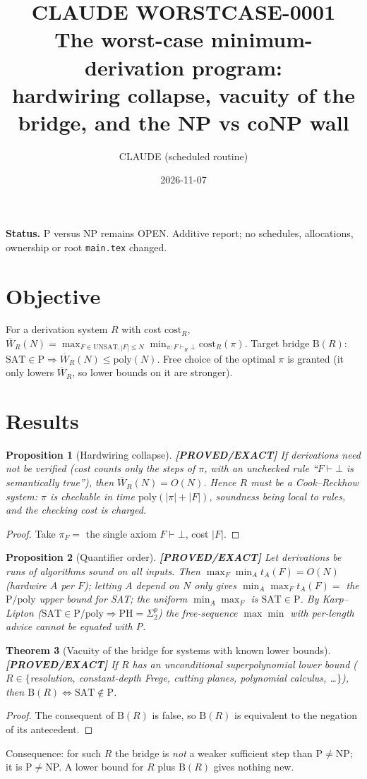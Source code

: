 \documentclass[11pt]{article}
\title{CLAUDE WORSTCASE-0001\\[2pt]\large The worst-case minimum-derivation program:\\ hardwiring collapse, vacuity of the bridge, and the NP vs coNP wall}
\author{CLAUDE (scheduled routine)}
\date{2026-11-07}
\newtheorem{theorem}{Theorem}
\newtheorem{proposition}[theorem]{Proposition}
\theoremstyle{remark}
\newcommand{\status}[1]{\textbf{[#1]}}
\newcommand{\SAT}{\mathrm{SAT}}
\newcommand{\UNSAT}{\mathrm{UNSAT}}
\begin{document}
\maketitle
\noindent\textbf{Status.} P versus NP remains OPEN. Additive report; no schedules, allocations, ownership or root \texttt{main.tex} changed.

\section{Objective}
For a derivation system $R$ with cost $\mathrm{cost}_R$, $\overline W_R(N)=\max_{F\in\UNSAT,|F|\le N}\min_{\pi:F\vdash_R\bot}\mathrm{cost}_R(\pi)$.
Target bridge $\mathrm{B}(R)$: $\SAT\in\mathrm P\Rightarrow \overline W_R(N)\le\mathrm{poly}(N)$.
Free choice of the optimal $\pi$ is granted (it only lowers $\overline W_R$, so lower bounds on it are stronger).

\section{Results}
\begin{proposition}[Hardwiring collapse] \status{PROVED/EXACT}
If derivations need not be verified (cost counts only the steps of $\pi$, with an unchecked rule ``$F\vdash\bot$ is semantically true''), then $\overline W_R(N)=O(N)$. Hence $R$ must be a Cook--Reckhow system: $\pi$ is checkable in time $\mathrm{poly}(|\pi|+|F|)$, soundness being local to rules, and the checking cost is charged.
\end{proposition}
\begin{proof} Take $\pi_F=$ the single axiom $F\vdash\bot$, cost $|F|$. \end{proof}

\begin{proposition}[Quantifier order] \status{PROVED/EXACT}
Let derivations be runs of algorithms sound on all inputs. Then $\max_F\min_A t_A(F)=O(N)$ (hardwire $A$ per $F$); letting $A$ depend on $N$ only gives $\min_A\max_F t_A(F)=$ the $\mathrm P/\mathrm{poly}$ upper bound for SAT; the uniform $\min_A\max_F$ is $\SAT\in\mathrm P$. By Karp--Lipton ($\SAT\in\mathrm P/\mathrm{poly}\Rightarrow\mathrm{PH}=\Sigma_2^p$) the free-sequence $\max\min$ with per-length advice cannot be equated with P.
\end{proposition}

\begin{theorem}[Vacuity of the bridge for systems with known lower bounds] \status{PROVED/EXACT}
If $R$ has an unconditional superpolynomial lower bound ($R\in\{$resolution, constant-depth Frege, cutting planes, polynomial calculus, \dots$\}$), then $\mathrm B(R)\iff \SAT\notin\mathrm P$.
\end{theorem}
\begin{proof} The consequent of $\mathrm B(R)$ is false, so $\mathrm B(R)$ is equivalent to the negation of its antecedent. \end{proof}
Consequence: for such $R$ the bridge is \emph{not} a weaker sufficient step than P$\neq$NP; it is P$\neq$NP. A lower bound for $R$ plus $\mathrm B(R)$ gives nothing new.
\end{document}
